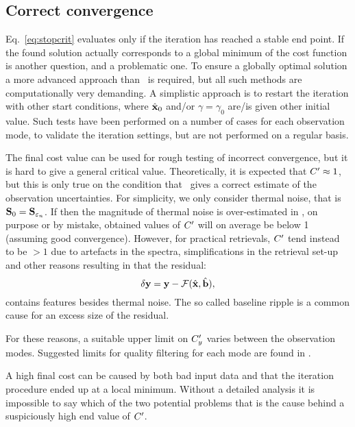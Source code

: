 \subsection{Correct convergence}
%
Eq.~\ref{eq:stopcrit} evaluates only if the iteration has reached a stable end
point. If the found solution actually corresponds to a global minimum of the
cost function is another question, and a problematic one. To ensure a globally
optimal solution a more advanced approach than \LM\ is required, but all
such methods are computationally very demanding. A simplistic approach is to
restart the iteration with other start conditions, where $\hat{\mathbf{x}}_0$ and/or
$\gamma=\gamma_0$ are/is given other initial value. Such tests have been
performed on a number of cases for each observation mode, to validate the
iteration settings, but are not performed on a regular basis.

The final cost value can be used for rough testing of incorrect convergence,
but it is hard to give a general critical value. Theoretically, it is expected
that $C'\approx1$, but this is only true on the condition that
\ gives a correct estimate of the observation uncertainties. For
simplicity, we only consider thermal noise, that is
$\mathbf{S}_{0}=\mathbf{S}_{\varepsilon_n}$. If then the magnitude of thermal noise is
over-estimated in , on purpose or by mistake, obtained values of
$C'$  will on average be below 1 (assuming good convergence). However, for
practical retrievals, $C'$ tend instead to be $>1$ due to artefacts in
the spectra, simplifications in the retrieval set-up and other reasons
resulting in that the residual:
\begin{equation}
  \label{eq:dy}
  \delta\mathbf{y} = \mathbf{y}-\mathcal{F}(\hat{\mathbf{x}},\hat{\mathbf{b}}),
\end{equation}
contains features besides thermal noise. The so called baseline ripple is a common
cause for an excess size of the residual.

For these reasons, a suitable upper limit on $C_y'$ varies between the
observation modes. Suggested limits for quality filtering for each mode are
found in \citet{atbdl2data}.

A high final cost can be caused by both bad input data and that the iteration
procedure ended up at a local minimum. Without a detailed analysis it is
impossible to say which of the two potential problems that is the cause behind
a suspiciously high end value of $C'$.


